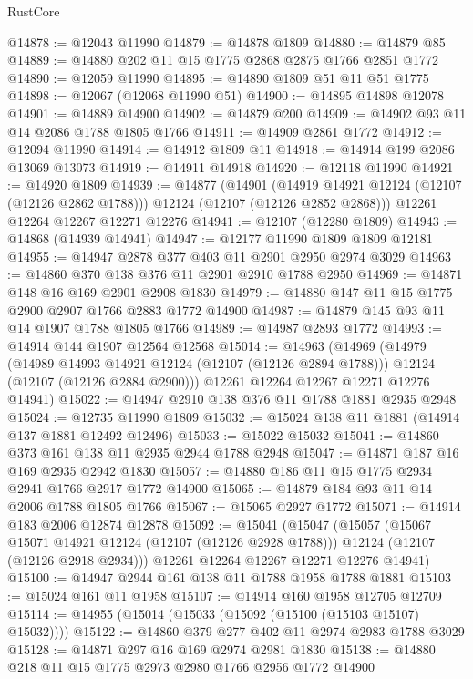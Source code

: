 \begin{lexlean}{RustCore}
\begin{coremodule}
@14878 := @12043 @11990
@14879 := @14878 @1809
@14880 := @14879 @85
@14889 := @14880 @202 @11 @15 @1775 @2868 @2875 @1766 @2851 @1772
@14890 := @12059 @11990
@14895 := @14890 @1809 @51 @11 @51 @1775
@14898 := @12067 (@12068 @11990 @51)
@14900 := @14895 @14898 @12078
@14901 := @14889 @14900
@14902 := @14879 @200
@14909 := @14902 @93 @11 @14 @2086 @1788 @1805 @1766
@14911 := @14909 @2861 @1772
@14912 := @12094 @11990
@14914 := @14912 @1809 @11
@14918 := @14914 @199 @2086 @13069 @13073
@14919 := @14911 @14918
@14920 := @12118 @11990
@14921 := @14920 @1809
@14939 := @14877
    (@14901
      (@14919 @14921 @12124 (@12107 (@12126 @2862 @1788)))
      @12124
      (@12107 (@12126 @2852 @2868)))
    @12261
    @12264
    @12267
    @12271
    @12276
@14941 := @12107 (@12280 @1809)
@14943 := @14868 (@14939 @14941)
@14947 := @12177 @11990 @1809 @1809 @12181
@14955 := @14947 @2878 @377 @403 @11 @2901 @2950 @2974 @3029
@14963 := @14860 @370 @138 @376 @11 @2901 @2910 @1788 @2950
@14969 := @14871 @148 @16 @169 @2901 @2908 @1830
@14979 := @14880 @147 @11 @15 @1775 @2900 @2907 @1766 @2883 @1772 @14900
@14987 := @14879 @145 @93 @11 @14 @1907 @1788 @1805 @1766
@14989 := @14987 @2893 @1772
@14993 := @14914 @144 @1907 @12564 @12568
@15014 := @14963
    (@14969
      (@14979
        (@14989 @14993 @14921 @12124 (@12107 (@12126 @2894 @1788)))
        @12124
        (@12107 (@12126 @2884 @2900)))
      @12261
      @12264
      @12267
      @12271
      @12276
      @14941)
@15022 := @14947 @2910 @138 @376 @11 @1788 @1881 @2935 @2948
@15024 := @12735 @11990 @1809
@15032 := @15024 @138 @11 @1881 (@14914 @137 @1881 @12492 @12496)
@15033 := @15022 @15032
@15041 := @14860 @373 @161 @138 @11 @2935 @2944 @1788 @2948
@15047 := @14871 @187 @16 @169 @2935 @2942 @1830
@15057 := @14880 @186 @11 @15 @1775 @2934 @2941 @1766 @2917 @1772 @14900
@15065 := @14879 @184 @93 @11 @14 @2006 @1788 @1805 @1766
@15067 := @15065 @2927 @1772
@15071 := @14914 @183 @2006 @12874 @12878
@15092 := @15041
    (@15047
      (@15057
        (@15067 @15071 @14921 @12124 (@12107 (@12126 @2928 @1788)))
        @12124
        (@12107 (@12126 @2918 @2934)))
      @12261
      @12264
      @12267
      @12271
      @12276
      @14941)
@15100 := @14947 @2944 @161 @138 @11 @1788 @1958 @1788 @1881
@15103 := @15024 @161 @11 @1958
@15107 := @14914 @160 @1958 @12705 @12709
@15114 := @14955 (@15014 (@15033 (@15092 (@15100 (@15103 @15107) @15032))))
@15122 := @14860 @379 @277 @402 @11 @2974 @2983 @1788 @3029
@15128 := @14871 @297 @16 @169 @2974 @2981 @1830
@15138 := @14880 @218 @11 @15 @1775 @2973 @2980 @1766 @2956 @1772 @14900

\end{coremodule}
\end{lexlean}
